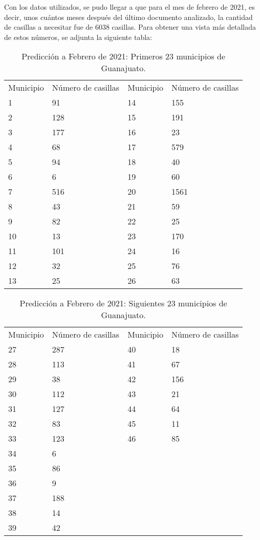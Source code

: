 \documentclass{article}
\begin{document}
Con los datos utilizados, se pudo llegar a que para el mes de febrero de 2021, es decir, unos cuántos meses después del último documento analizado, la cantidad de casillas a necesitar fue de 6038 casillas. Para obtener una vista más detallada de estos números, se adjunta la siguiente tabla: 
\clearpage
\begin{table}[h!]
\begin{tabular}{llll}
Municipio & Número de casillas & Municipio & Número de casillas\\
1 & 91 & 14 & 155 \\
2 & 128 & 15 & 191  \\
3 & 177 & 16 & 23  \\
4 & 68 & 17 & 579 \\
5 & 94 & 18 & 40 \\
6 & 6 & 19 & 60  \\
7 & 516 & 20 & 1561  \\
8 & 43 & 21 & 59   \\
9 & 82 & 22 & 25  \\
10 & 13 & 23 & 170  \\
11 & 101 & 24 & 16  \\
12 & 32 & 25 & 76  \\
13 & 25 & 26 & 63 
\end{tabular}
\caption{Predicción a Febrero de 2021: Primeros 23 municipios de Guanajuato.}
\label{tab:my_label}
\end{table}

\begin{table}[h!]
\begin{tabular}{llll}
 Municipio & Número de casillas & Municipio & Número de casillas \\
 27 & 287 & 40 & 18 \\
 28 & 113 & 41 & 67 \\
 29 & 38 & 42 & 156 \\
 30 & 112 & 43 & 21 \\
 31 & 127 & 44 & 64 \\
 32 & 83 & 45 & 11 \\
33 & 123 & 46 & 85 \\
 34 & 6 &  &  \\
 35 & 86 &  &  \\
 36 & 9 &  &  \\
37 & 188 &  &  \\
 38 & 14 &  &  \\
 39 & 42 &  & 
\end{tabular}
\caption{Predicción a Febrero de 2021: Siguientes 23 municipios de Guanajuato.}
\label{tab:my_label}
\end{table}\\
\end{document}
